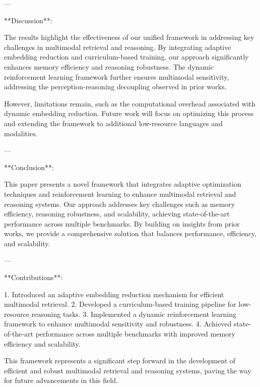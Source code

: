 ---

**Discussion**:  

The results highlight the effectiveness of our unified framework in addressing key challenges in multimodal retrieval and reasoning. By integrating adaptive embedding reduction and curriculum-based training, our approach significantly enhances memory efficiency and reasoning robustness. The dynamic reinforcement learning framework further ensures multimodal sensitivity, addressing the perception-reasoning decoupling observed in prior works.  

However, limitations remain, such as the computational overhead associated with dynamic embedding reduction. Future work will focus on optimizing this process and extending the framework to additional low-resource languages and modalities.  

---

**Conclusion**:  

This paper presents a novel framework that integrates adaptive optimization techniques and reinforcement learning to enhance multimodal retrieval and reasoning systems. Our approach addresses key challenges such as memory efficiency, reasoning robustness, and scalability, achieving state-of-the-art performance across multiple benchmarks. By building on insights from prior works, we provide a comprehensive solution that balances performance, efficiency, and scalability.  

---

**Contributions**:  

1. Introduced an adaptive embedding reduction mechanism for efficient multimodal retrieval.  
2. Developed a curriculum-based training pipeline for low-resource reasoning tasks.  
3. Implemented a dynamic reinforcement learning framework to enhance multimodal sensitivity and robustness.  
4. Achieved state-of-the-art performance across multiple benchmarks with improved memory efficiency and scalability.  

This framework represents a significant step forward in the development of efficient and robust multimodal retrieval and reasoning systems, paving the way for future advancements in this field.  